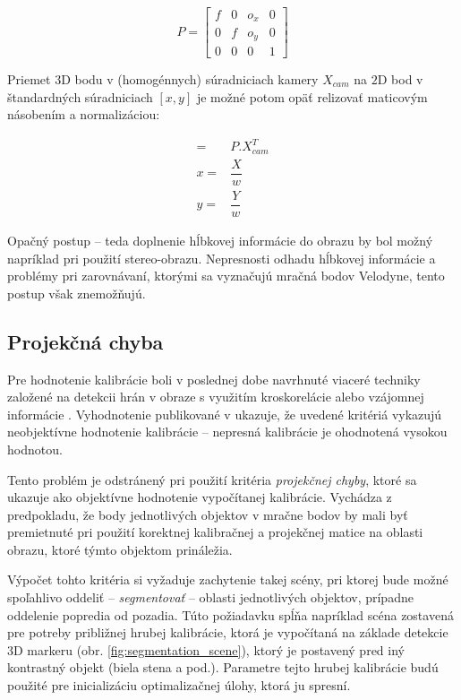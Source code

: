 \documentclass[12pt, a4paper]{article}
\begin{document}
\begin{equation}
P = \left[ 
      \begin{array}{cccc} 
	f & 0 & o_x & 0 \\
	0 & f & o_y & 0 \\ 
	0 & 0 & 0 & 1
      \end{array}
    \right]	\label{eq:projection}
\end{equation}

Priemet $3$D bodu v (homogénnych) súradniciach kamery $X_{cam}$ na $2$D bod v štandardných súradniciach $[x, y]$ je možné potom opäť relizovať maticovým násobením a normalizáciou:

\begin{eqnarray}
	[X,Y,Z,w] =& P . X_{cam}^T \\
	x =& \dfrac{X}{w} \\
	y =& \dfrac{Y}{w}
\end{eqnarray}

Opačný postup -- teda doplnenie hĺbkovej informácie do obrazu by bol možný napríklad pri použití stereo-obrazu. Nepresnosti odhadu hĺbkovej informácie a problémy pri zarovnávaní, ktorými sa vyznačujú mračná bodov Velodyne, tento postup však znemožňujú. 

\subsection{Projekčná chyba}
Pre hodnotenie kalibrácie boli v poslednej dobe navrhnuté viaceré techniky založené na detekcii hrán v obraze s využitím kroskorelácie \cite{levinson} alebo vzájomnej informácie \cite{taylor}. Vyhodnotenie publikované v \cite{velas} ukazuje, že uvedené kritériá vykazujú neobjektívne hodnotenie kalibrácie -- nepresná kalibrácie je ohodnotená vysokou hodnotou.

Tento problém je odstránený pri použití kritéria \emph{projekčnej chyby}, ktoré sa ukazuje ako objektívne hodnotenie vypočítanej kalibrácie. Vychádza z predpokladu, že body jednotlivých objektov v mračne bodov by mali byť premietnuté pri použití korektnej kalibračnej a projekčnej matice na oblasti obrazu, ktoré týmto objektom prináležia.

Výpočet tohto kritéria si vyžaduje zachytenie takej scény, pri ktorej bude možné spoľahlivo oddeliť -- \emph{segmentovať} -- oblasti jednotlivých objektov, prípadne oddelenie popredia od pozadia. Túto požiadavku spĺňa napríklad scéna zostavená pre potreby približnej hrubej kalibrácie, ktorá je vypočítaná na základe detekcie $3$D markeru (obr. \ref{fig:segmentation_scene}), ktorý je postavený pred iný kontrastný objekt (biela stena a pod.). Parametre tejto hrubej kalibrácie budú použité pre inicializáciu optimalizačnej úlohy, ktorá ju spresní.
\end{document}
